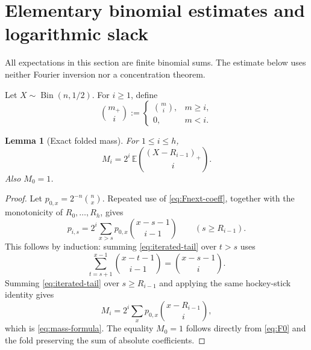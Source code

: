 \documentclass[11pt]{article}
\newtheorem{lemma}[theorem]{Lemma}
\theoremstyle{definition}
\theoremstyle{remark}
\begin{document}
\section{Elementary binomial estimates and logarithmic slack}\label{sec:norms}

All expectations in this section are finite binomial sums. The estimate
below uses neither Fourier inversion nor a concentration theorem.

Let $X\sim\operatorname{Bin}(n,1/2)$.  For $i\ge1$, define
\[
 \binom{m_+}{i}:=
 \begin{cases}
 \binom mi,&m\ge i,\\
 0,&m<i.
 \end{cases}
\]

\begin{lemma}[Exact folded mass]\label{lem:mass-formula}
For $1\le i\le h$,
\begin{equation}\label{eq:mass-formula}
 M_i=2^i\,\mathbb E
 \binom{(X-R_{i-1})_+}{i}.
\end{equation}
Also $M_0=1$.
\end{lemma}

\begin{proof}
Let $p_{0,x}=2^{-n}\binom nx$.  Repeated use of \eqref{eq:Fnext-coeff}, together with the monotonicity of $R_0,\ldots,R_h$, gives
\begin{equation}\label{eq:iterated-tail}
 p_{i,s}
 =2^i\sum_{x>s}p_{0,x}\binom{x-s-1}{i-1}
 \qquad(s\ge R_{i-1}).
\end{equation}
This follows by induction: summing \eqref{eq:iterated-tail} over $t>s$ uses
\[
 \sum_{t=s+1}^{x-1}\binom{x-t-1}{i-1}
 =\binom{x-s-1}{i}.
\]
Summing \eqref{eq:iterated-tail} over $s\ge R_{i-1}$ and applying the same hockey-stick identity gives
\[
 M_i
 =2^i\sum_xp_{0,x}\binom{x-R_{i-1}}i,
\]
which is \eqref{eq:mass-formula}.  The equality $M_0=1$ follows directly from \eqref{eq:F0} and the fold preserving the sum of absolute coefficients.
\end{proof}
\end{document}
